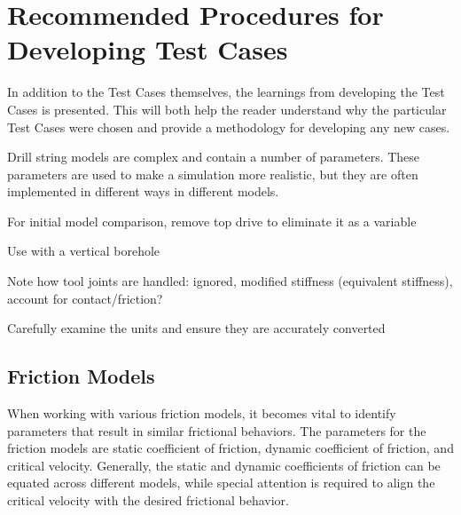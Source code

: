 \chapter{Recommended Procedures for Developing Test Cases}

In addition to the Test Cases themselves, the learnings from developing the Test Cases is presented.  This will both help the reader understand why the particular Test Cases were chosen and provide a methodology for developing any new cases.


Drill string models are complex and contain a number of parameters.  These parameters are used to make a simulation more realistic, but they are often implemented in different ways in different models.



\begin{bulletedlist}
	\item For initial model comparison, remove top drive to eliminate it as a variable
	\item Use with a vertical borehole

	\item Note how tool joints are handled: ignored, modified stiffness (equivalent stiffness), account for contact/friction?
	\item Carefully examine the units and ensure they are accurately converted
\end{bulletedlist}
\notfinished{}

\section{Friction Models}
When working with various friction models, it becomes vital to identify parameters that result in similar frictional behaviors.  The parameters for the friction models are static coefficient of friction, dynamic coefficient of friction, and critical velocity. Generally, the static and dynamic coefficients of friction can be equated across different models, while special attention is required to align the critical velocity with the desired frictional behavior.

